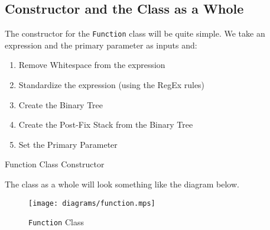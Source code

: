 \documentclass[../../../../../main.tex]{subfiles}
\begin{document}
\subsection{Constructor and the Class as a Whole}
The constructor for the \texttt{Function} class will be quite simple. We take an expression and the primary parameter as inputs and:
\begin{enumerate}
	\item Remove Whitespace from the expression
	\item Standardize the expression (using the RegEx rules)
	\item Create the Binary Tree
	\item Create the Post-Fix Stack from the Binary Tree
	\item Set the Primary Parameter
\end{enumerate}
\begin{algorithm}
\DontPrintSemicolon
\caption{Function Class Constructor}
\end{algorithm}
The class as a whole will look something like the diagram below.
\begin{figure}[H]
	\centering
	\texttt{[image: diagrams/function.mps]}
	\caption{\texttt{Function} Class}
\end{figure}
\newpage
\end{document}
